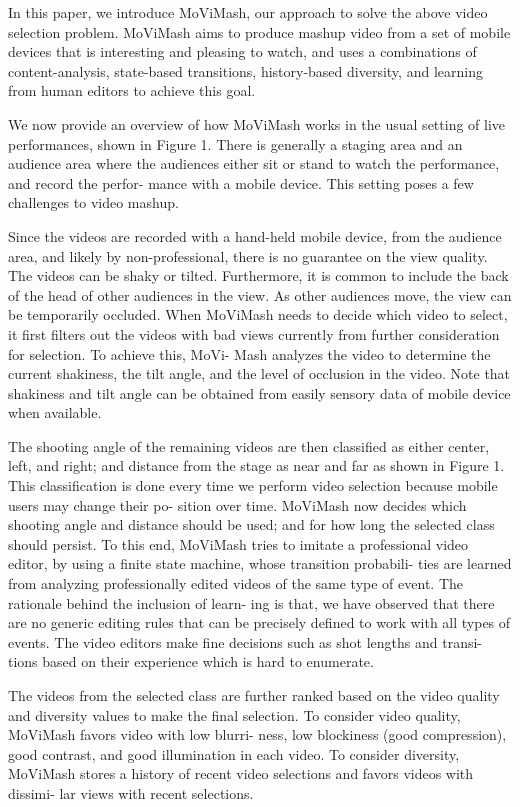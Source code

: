 \documentclass{sig-alternate}
\begin{document}
In this paper, we introduce MoViMash, our approach to solve
the above video selection problem. MoViMash aims to produce
mashup video from a set of mobile devices that is interesting and
pleasing to watch, and uses a combinations of content-analysis,
state-based transitions, history-based diversity, and learning from
human editors to achieve this goal.

We now provide an overview of how MoViMash works in the
usual setting of live performances, shown in Figure 1. There is
generally a staging area and an audience area where the audiences
either sit or stand to watch the performance, and record the perfor-
mance with a mobile device. This setting poses a few challenges to
video mashup.

Since the videos are recorded with a hand-held mobile device,
from the audience area, and likely by non-professional, there is no
guarantee on the view quality. The videos can be shaky or tilted.
Furthermore, it is common to include the back of the head of other
audiences in the view. As other audiences move, the view can be
temporarily occluded. When MoViMash needs to decide which
video to select, it first filters out the videos with bad views currently
from further consideration for selection. To achieve this, MoVi-
Mash analyzes the video to determine the current shakiness, the tilt
angle, and the level of occlusion in the video. Note that shakiness and tilt angle can be obtained from easily sensory data of mobile
device when available.

The shooting angle of the remaining videos are then classified as
either center, left, and right; and distance from the stage as near and
far as shown in Figure 1. This classification is done every time we
perform video selection because mobile users may change their po-
sition over time. MoViMash now decides which shooting angle and
distance should be used; and for how long the selected class should
persist. To this end, MoViMash tries to imitate a professional video
editor, by using a finite state machine, whose transition probabili-
ties are learned from analyzing professionally edited videos of the
same type of event. The rationale behind the inclusion of learn-
ing is that, we have observed that there are no generic editing rules
that can be precisely defined to work with all types of events. The
video editors make fine decisions such as shot lengths and transi-
tions based on their experience which is hard to enumerate.

The videos from the selected class are further ranked based on
the video quality and diversity values to make the final selection.
To consider video quality, MoViMash favors video with low blurri-
ness, low blockiness (good compression), good contrast, and good
illumination in each video. To consider diversity, MoViMash stores
a history of recent video selections and favors videos with dissimi-
lar views with recent selections.
\end{document}
